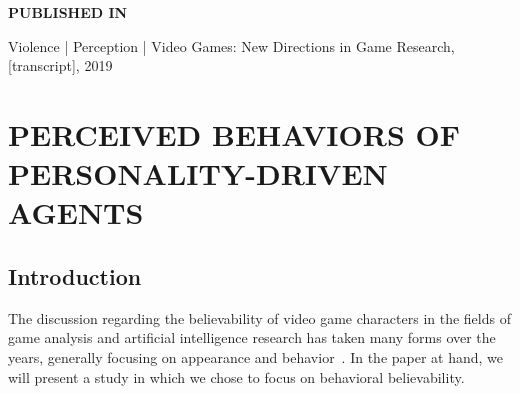 \graphicspath{{included-papers-tex/paper-4/figures/}}


\normalfont


\textbf{\textsc{PUBLISHED IN}}

Violence | Perception | Video Games: New Directions in Game Research, [transcript], 2019


\section*{PERCEIVED BEHAVIORS OF \\ PERSONALITY-DRIVEN AGENTS}

\subsection{Introduction}

The discussion regarding the believability of video game characters in the fields of game analysis and artificial intelligence research has taken many forms over the years, generally focusing on appearance and behavior~. In the paper at hand, we will present a study in which we chose to focus on behavioral believability.

